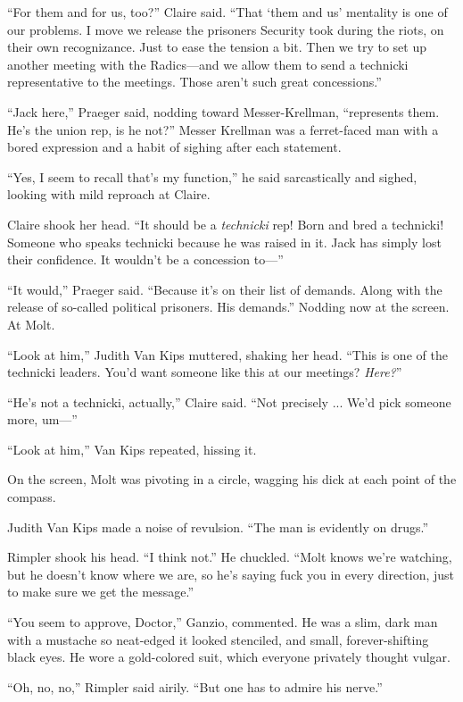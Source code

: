 ``For them and for us, too?'' Claire said. ``That ‘them and us' mentality is one of our problems. I move we release the prisoners Security took during the riots, on their own recognizance. Just to ease the tension a bit. Then we try to set up another meeting with the Radics---and we allow them to send a technicki representative to the meetings. Those aren't such great concessions.''

``Jack here,'' Praeger said, nodding toward Messer-Krellman, ``represents them. He's the union rep, is he not?'' Messer Krellman was a ferret-faced man with a bored expression and a habit of sighing after each statement.

``Yes, I seem to recall that's my function,'' he said sarcastically and sighed, looking with mild reproach at Claire.

Claire shook her head. ``It should be a \textit{technicki} rep! Born and bred a technicki! Someone who speaks technicki because he was raised in it. Jack has simply lost their confidence. It wouldn't be a concession to---''

``It would,'' Praeger said. ``Because it's on their list of demands. Along with the release of so-called political prisoners. His demands.'' Nodding now at the screen. At Molt.

``Look at him,'' Judith Van Kips muttered, shaking her head. ``This is one of the technicki leaders. You'd want someone like this at our meetings? \textit{Here?}''

``He's not a technicki, actually,'' Claire said. ``Not precisely ... We'd pick someone more, um---''

``Look at him,'' Van Kips repeated, hissing it.

On the screen, Molt was pivoting in a circle, wagging his dick at each point of the compass.

Judith Van Kips made a noise of revulsion. ``The man is evidently on drugs.''

Rimpler shook his head. ``I think not.'' He chuckled. ``Molt knows we're watching, but he doesn't know where we are, so he's saying fuck you in every direction, just to make sure we get the message.''

``You seem to approve, Doctor,'' Ganzio, commented. He was a slim, dark man with a mustache so neat-edged it looked stenciled, and small, forever-shifting black eyes. He wore a gold-colored suit, which everyone privately thought vulgar.

``Oh, no, no,'' Rimpler said airily. ``But one has to admire his nerve.''

